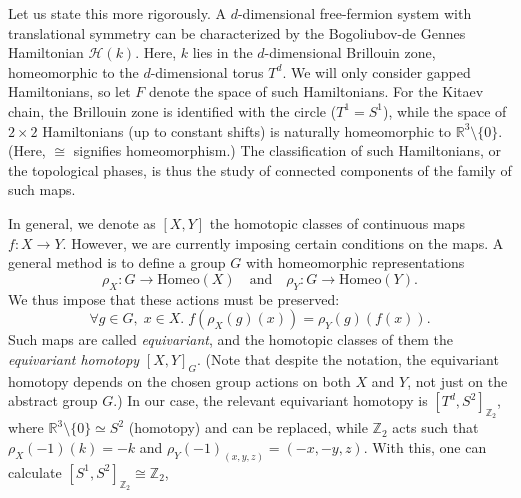 \documentclass{article}
\begin{document}
Let us state this more rigorously.
A $d$-dimensional free-fermion system with translational symmetry can be characterized
by the Bogoliubov-de Gennes Hamiltonian $\mathcal{H}(k)$.
Here, $k$ lies in the $d$-dimensional Brillouin zone, homeomorphic to the $d$-dimensional torus $T^d$.
We will only consider gapped Hamiltonians, so let $F$ denote the space of such Hamiltonians.
For the Kitaev chain, the Brillouin zone is identified with the circle ($T^1 =  S^1$),
while the space of $2\times 2$ Hamiltonians (up to constant shifts) is naturally homeomorphic to $\mathbb{R}^3\setminus\{0\}$.
(Here, $\cong$ signifies homeomorphism.)
The classification of such Hamiltonians, or the topological phases,
is thus the study of connected components of the family of such maps.

In general, we denote as $[X,Y]$ the homotopic classes of continuous maps $f: X \rightarrow Y$.
However, we are currently imposing certain conditions on the maps.
A general method is to define a group $G$ with homeomorphic representations
\[
	\rho_X: G \rightarrow \mathrm{Homeo}(X)\quad \text{and}\quad \rho_Y: G \rightarrow \mathrm{Homeo}(Y).
\]
We thus impose that these actions must be preserved:
\[
	\forall g \in G,\; x \in X.\; f(\rho_X(g)(x)) = \rho_Y(g)(f(x)).
\]
Such maps are called \emph{equivariant}, and the homotopic classes of them the \emph{equivariant homotopy} $[X,Y]_G$.
(Note that despite the notation, the equivariant homotopy depends on the chosen group actions on both $X$ and $Y$,
not just on the abstract group $G$.)
In our case, the relevant equivariant homotopy is $[T^d, S^2]_{\mathbb{Z}_2}$,
where $\mathbb{R}^3\setminus\{0\} \simeq S^2$ (homotopy) and can be replaced,
while $\mathbb{Z}_2$ acts such that $\rho_X(-1)(k) = -k$ and $\rho_Y(-1)_(x, y, z) = (-x, -y, z)$.
With this, one can calculate $[S^1, S^2]_{\mathbb{Z}_2} \cong \mathbb{Z}_2$,
\end{document}
